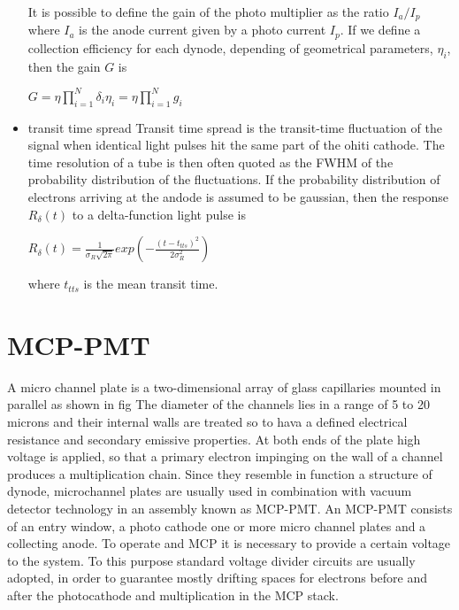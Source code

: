 \begin{itemize}
It is possible to define the gain of the photo multiplier as the ratio $I_{a}/I_{p}$ where $I_{a}$ is the anode current given by a photo current $I_{p}$. If we define a collection efficiency for each dynode, depending of geometrical parameters, $\eta _{i}$, then the gain $G$ is

$G = \eta \prod_{i=1}^N \delta _{i} \eta _{i} = \eta \prod_{i=1}^N g_{i}$

\item transit time spread
Transit time spread is the transit-time fluctuation of the signal when identical light pulses hit the same part of the ohiti cathode. The time resolution of a tube is then often quoted as the FWHM of the probability distribution of the fluctuations.
If the probability distribution of electrons arriving at the andode is assumed to be gaussian, then the response $R_{\delta}(t)$ to a delta-function light pulse is

$R_{\delta}(t) = \frac{1}{\sigma _{R}\sqrt {2\pi}}exp\left( -\frac{(t-t_{tts})^2}{2\sigma _{R}^2}\right)$

where $t_{tts}$ is the mean transit time.
\end{itemize}

\section{MCP-PMT}
A micro channel plate is a two-dimensional array of glass capillaries mounted in parallel as shown in fig
The diameter of the channels lies in a range of 5 to 20 microns and their internal walls are treated so to hava a defined electrical resistance and secondary emissive properties.
At both ends of the plate high voltage is applied, so that a primary electron impinging on the wall of a channel produces a multiplication chain.
Since they resemble in function a structure of dynode, microchannel plates are usually used in combination with vacuum detector technology in an assembly known as MCP-PMT.
An MCP-PMT consists of an entry window, a photo cathode one or more micro channel plates and a collecting anode.
To operate and MCP it is necessary to provide a certain voltage to the system. To this purpose standard voltage divider circuits are usually adopted, in order to guarantee mostly drifting spaces for electrons before and after the photocathode and multiplication in the MCP stack.
  

